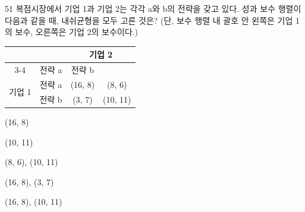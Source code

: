 \begin{question}{51}
복점시장에서 기업 1과 기업 2는 각각 a와 b의 전략을 갖고 있다. 성과 보수 행렬이 다음과 같을 때, 내쉬균형을 모두 고른 것은? (단, 보수 행렬 내 괄호 안 왼쪽은 기업 1의 보수, 오른쪽은 기업 2의 보수이다.)

{\small\centering\renewcommand{\arraystretch}{1.3}
\begin{tabular}{|c|c|c|c|}\hline
\multicolumn{2}{|c|}{\rule{0pt}{1.2em}} & \multicolumn{2}{c|}{기업 2} \\ \cline{3-4}
\multicolumn{2}{|c|}{} & 전략 a & 전략 b \\ \hline
\multirow{2}{*}{기업 1} & 전략 a & (16, 8) & (8, 6) \\ \cline{2-4}
 & 전략 b & (3, 7) & (10, 11) \\ \hline
\end{tabular}\par}
\begin{choices}
  \item (16, 8)
  \item (10, 11)
  \item (8, 6), (10, 11)
  \item (16, 8), (3, 7)
  \item (16, 8), (10, 11)
\end{choices}
\end{question}
